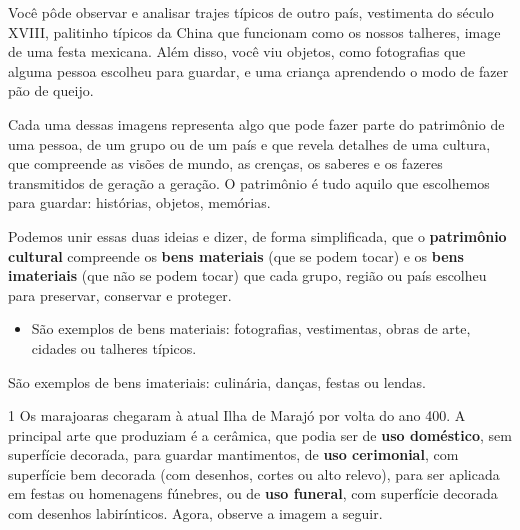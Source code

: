 {Você pôde observar e analisar trajes típicos de outro país, vestimenta do
século XVIII, palitinho típicos da China que funcionam como os nossos talheres,
image de uma festa mexicana. Além disso, você viu objetos, como fotografias que alguma pessoa
escolheu para guardar, e uma criança aprendendo o modo de
fazer pão de queijo.

Cada uma dessas imagens representa algo que pode fazer parte do patrimônio de uma pessoa, de
um grupo ou de um país e que revela detalhes de uma cultura, que compreende as visões de mundo, as crenças, os saberes e os
fazeres transmitidos de geração a geração. O patrimônio é tudo aquilo que escolhemos para guardar: histórias,
objetos, memórias.

Podemos unir essas duas ideias e dizer, de forma
simplificada, que o \textbf{patrimônio cultural} compreende os \textbf{bens materiais}
(que se podem tocar) e os \textbf{bens imateriais} (que não se podem tocar) que cada grupo,
região ou país escolheu para preservar, conservar e proteger.

\begin{itemize}
  \item São exemplos de bens materiais: fotografias, vestimentas, obras de arte,
cidades ou talheres típicos.
\end{itemize}
\item São exemplos de bens imateriais: culinária, danças,
festas ou lendas.}




\num{1} Os marajoaras chegaram à atual Ilha de Marajó por volta do ano 400. A principal arte que produziam é a cerâmica, que podia ser de \textbf{uso doméstico}, sem superfície decorada, para guardar mantimentos, de \textbf{uso cerimonial}, com superfície bem decorada (com desenhos, cortes ou alto relevo), para ser aplicada em festas ou homenagens fúnebres, ou de \textbf{uso funeral}, com superfície decorada com desenhos labirínticos. Agora, observe a imagem a seguir.

